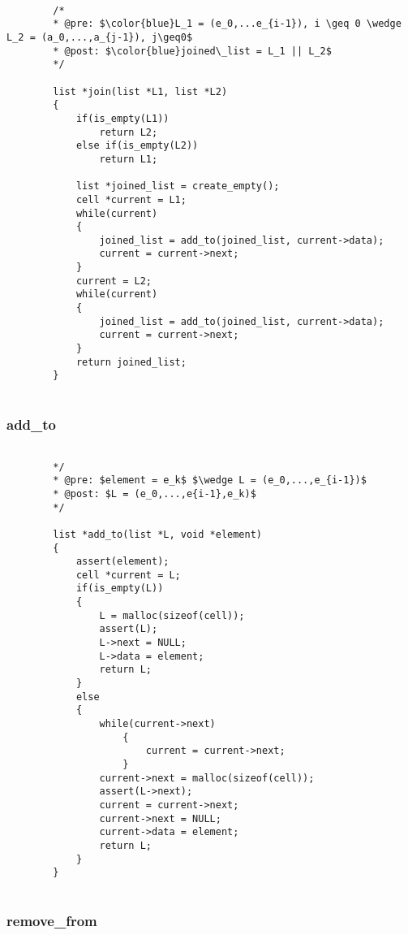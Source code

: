 \documentclass[a4paper, 11pt, oneside]{article}
\begin{document}
	\begin{lstlisting}[mathescape]	
	
		/*
		* @pre: $\color{blue}L_1 = (e_0,...e_{i-1}), i \geq 0 \wedge L_2 = (a_0,...,a_{j-1}), j\geq0$
		* @post: $\color{blue}joined\_list = L_1 || L_2$
		*/
		
		list *join(list *L1, list *L2)
		{
   			if(is_empty(L1))
      			return L2;
   			else if(is_empty(L2))
      			return L1;

   			list *joined_list = create_empty();
   			cell *current = L1;
   			while(current)
   			{
      			joined_list = add_to(joined_list, current->data);
      			current = current->next;
   			}
   			current = L2;
   			while(current)
   			{
      			joined_list = add_to(joined_list, current->data);
      			current = current->next;
   			}
   			return joined_list;
		}	
	
	\end{lstlisting}
	
	\subsubsection{add\_to}
	\begin{lstlisting}[mathescape]
	
		*/
		* @pre: $element = e_k$ $\wedge L = (e_0,...,e_{i-1})$
		* @post: $L = (e_0,...,e{i-1},e_k)$
		*/
		
		list *add_to(list *L, void *element)
		{
   			assert(element);
   			cell *current = L;
   			if(is_empty(L))
   			{
      			L = malloc(sizeof(cell));
      			assert(L);
      			L->next = NULL;
      			L->data = element;
      			return L;
   			}
   			else
   			{
      			while(current->next)
      				{
         				current = current->next;
      				}
      			current->next = malloc(sizeof(cell));
      			assert(L->next);
      			current = current->next;
      			current->next = NULL;
      			current->data = element;
      			return L;
   			}
		}	
		
	\end{lstlisting}
	
	\subsubsection{remove\_from}
	
	\begin{lstlisting}[mathescape]
	
	\end{lstlisting}
\end{document}

